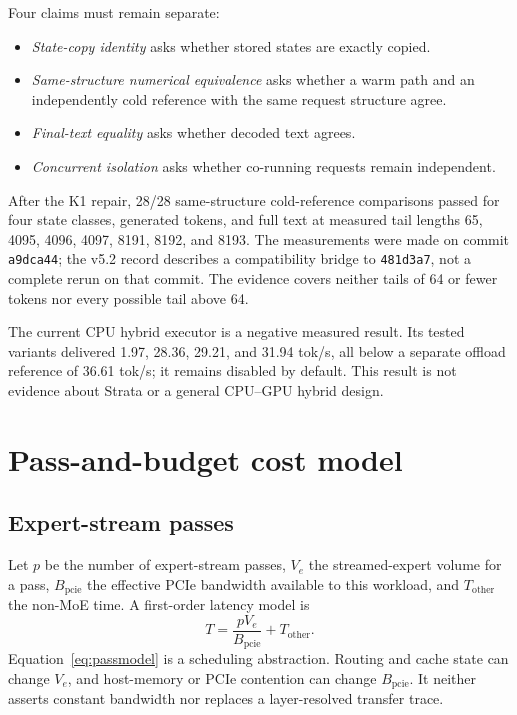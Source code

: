 \documentclass[11pt]{article}
\begin{document}
Four claims must remain separate:
\begin{itemize}
  \item \textit{State-copy identity} asks whether stored states are exactly copied.
  \item \textit{Same-structure numerical equivalence} asks whether a warm path and an independently cold reference with the same request structure agree.
  \item \textit{Final-text equality} asks whether decoded text agrees.
  \item \textit{Concurrent isolation} asks whether co-running requests remain independent.
\end{itemize}

After the K1 repair, 28/28 same-structure cold-reference comparisons passed for four state classes, generated tokens, and full text at measured tail lengths 65, 4095, 4096, 4097, 8191, 8192, and 8193. The measurements were made on commit \texttt{a9dca44}; the v5.2 record describes a compatibility bridge to \texttt{481d3a7}, not a complete rerun on that commit. The evidence covers neither tails of 64 or fewer tokens nor every possible tail above 64.

The current CPU hybrid executor is a negative measured result. Its tested variants delivered 1.97, 28.36, 29.21, and 31.94 tok/s, all below a separate offload reference of 36.61 tok/s; it remains disabled by default. This result is not evidence about Strata or a general CPU--GPU hybrid design.

\section{Pass-and-budget cost model}

\subsection{Expert-stream passes}

Let $p$ be the number of expert-stream passes, $V_e$ the streamed-expert volume for a pass, $B_{\mathrm{pcie}}$ the effective PCIe bandwidth available to this workload, and $T_{\mathrm{other}}$ the non-MoE time. A first-order latency model is
\begin{equation}
T = \frac{p V_e}{B_{\mathrm{pcie}}} + T_{\mathrm{other}}.
\label{eq:passmodel}
\end{equation}
Equation~\ref{eq:passmodel} is a scheduling abstraction. Routing and cache state can change $V_e$, and host-memory or PCIe contention can change $B_{\mathrm{pcie}}$. It neither asserts constant bandwidth nor replaces a layer-resolved transfer trace.
\end{document}
